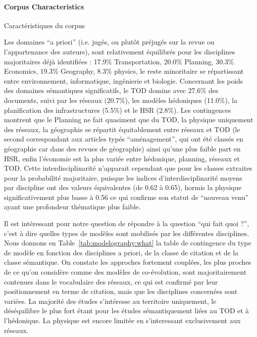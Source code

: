 \paragraph{Corpus Characteristics}{Caractéristiques du corpus}

%

Les domaines ``a priori'' (i.e. jugés, ou plutôt préjugés sur la revue ou l'appartenance des auteurs), sont relativement équilibrés pour les disciplines majoritaires déjà identifiées : 17.9\% Transportation, 20.0\% Planning, 30.3\% Economics, 19.3\% Geography, 8.3\% physics, le reste minoritaire se répartissant entre environnement, informatique, ingénierie et biologie. Concernant les poids des domaines sémantiques significatifs, le TOD domine avec 27.6\% des documents, suivi par les réseaux (20.7\%), les modèles hédoniques (11.0\%), la planification des infrastructures (5.5\%) et le HSR (2.8\%). Les contingences montrent que le Planning ne fait quasiment que du TOD, la physique uniquement des réseaux, la géographie se répartit équitablement entre réseaux et TOD (le second correspondant aux articles typés ``aménagement'', qui ont été classés en géographie car dans des revues de géographie) ainsi qu'une plus faible part en HSR, enfin l'économie est la plus variée entre hédonique, planning, réseaux et TOD. Cette interdisciplinarité n'apparait cependant que pour les classes extraites pour la probabilité majoritaire, puisque les indices d'interdisciplinarité moyens par discipline ont des valeurs équivalentes (de 0.62 à 0.65), hormis la physique significativement plus basse à 0.56 ce qui confirme son statut de ``nouveau venu'' ayant une profondeur thématique plus faible.


Il est intéressant pour notre question de répondre à la question ``qui fait quoi ?'', c'est à dire quelles types de modèles sont mobilisés par les différentes disciplines. Nous donnons en Table~\ref{tab:modelography:what} la table de contingence du type de modèle en fonction des disciplines a priori, de la classe de citation et de la classe sémantique. On constate les approches fortement couplées, les plus proches de ce qu'on considère comme des modèles de co-évolution, sont majoritairement contenues dans le vocabulaire des réseaux, ce qui est confirmé par leur positionnement en terme de citation, mais que les disciplines concernées sont variées. La majorité des études s'intéresse au territoire uniquement, le déséquilibre le plus fort étant pour les études sémantiquement liées au TOD et à l'hédonique. La physique est encore limitée en s'interessant exclusivement aux réseaux. 


